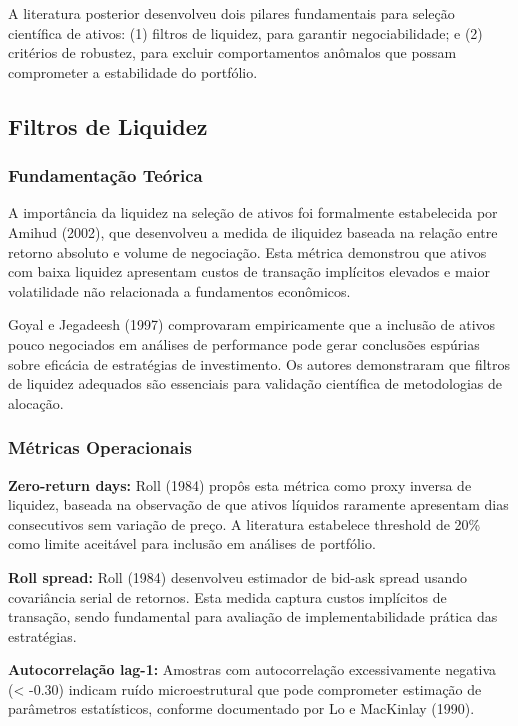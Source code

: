 A literatura posterior desenvolveu dois pilares fundamentais para seleção científica de ativos: (1) filtros de liquidez, para garantir negociabilidade; e (2) critérios de robustez, para excluir comportamentos anômalos que possam comprometer a estabilidade do portfólio.

\subsection{Filtros de Liquidez}

\subsubsection{Fundamentação Teórica}

A importância da liquidez na seleção de ativos foi formalmente estabelecida por Amihud (2002), que desenvolveu a medida de iliquidez baseada na relação entre retorno absoluto e volume de negociação. Esta métrica demonstrou que ativos com baixa liquidez apresentam custos de transação implícitos elevados e maior volatilidade não relacionada a fundamentos econômicos.

Goyal e Jegadeesh (1997) comprovaram empiricamente que a inclusão de ativos pouco negociados em análises de performance pode gerar conclusões espúrias sobre eficácia de estratégias de investimento. Os autores demonstraram que filtros de liquidez adequados são essenciais para validação científica de metodologias de alocação.

\subsubsection{Métricas Operacionais}

\textbf{Zero-return days:} Roll (1984) propôs esta métrica como proxy inversa de liquidez, baseada na observação de que ativos líquidos raramente apresentam dias consecutivos sem variação de preço. A literatura estabelece threshold de 20\% como limite aceitável para inclusão em análises de portfólio.

\textbf{Roll spread:} Roll (1984) desenvolveu estimador de bid-ask spread usando covariância serial de retornos. Esta medida captura custos implícitos de transação, sendo fundamental para avaliação de implementabilidade prática das estratégias.

\textbf{Autocorrelação lag-1:} Amostras com autocorrelação excessivamente negativa (< -0.30) indicam ruído microestrutural que pode comprometer estimação de parâmetros estatísticos, conforme documentado por Lo e MacKinlay (1990).


